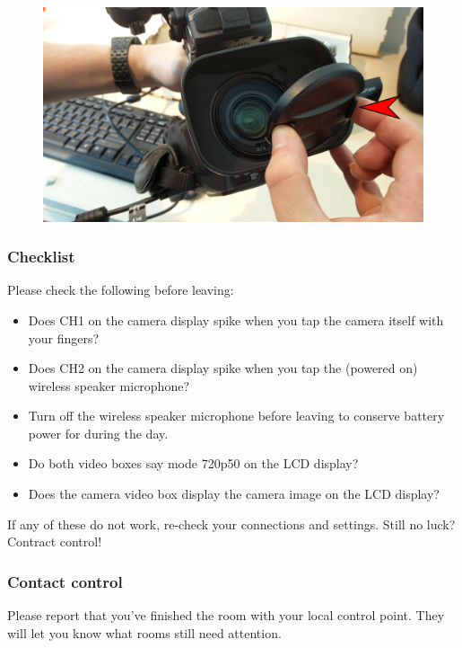 \documentclass{article}
\begin{document}
\begin{figure}[H]
  \centering
\includegraphics[width = 120mm]{Canon07.jpg}
\end{figure}

\subsubsection{Checklist}
Please check the following before leaving:
\begin{itemize}
  \item Does CH1 on the camera display spike when you tap the camera itself with your fingers?
  \item Does CH2 on the camera display spike when you tap the (powered on) wireless speaker microphone?
  \item Turn off the wireless speaker microphone before leaving to conserve battery power for during the day.
  \item Do both video boxes say mode 720p50 on the LCD display?
  \item Does the camera video box display the camera image on the LCD display?
\end{itemize}

If any of these do not work, re-check your connections and settings. Still no luck? Contract control!

\subsubsection{Contact control}
Please report that you've finished the room with your local control point.
They will let you know what rooms still need attention.
\end{document}

